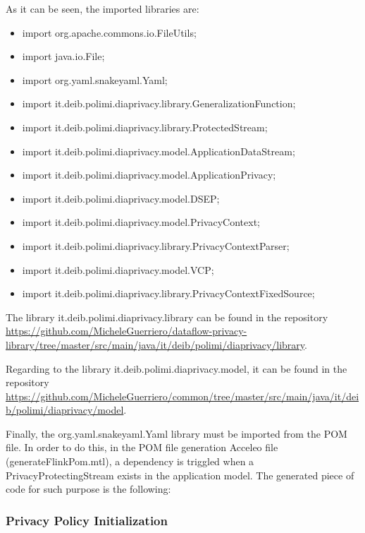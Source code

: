 

As it can be seen, the imported libraries are:

\begin{itemize}
\item import org.apache.commons.io.FileUtils;
\item import java.io.File;
\item import org.yaml.snakeyaml.Yaml;
\item import it.deib.polimi.diaprivacy.library.GeneralizationFunction;
\item import it.deib.polimi.diaprivacy.library.ProtectedStream;
\item import it.deib.polimi.diaprivacy.model.ApplicationDataStream;
\item import it.deib.polimi.diaprivacy.model.ApplicationPrivacy;
\item import it.deib.polimi.diaprivacy.model.DSEP;
\item import it.deib.polimi.diaprivacy.model.PrivacyContext;
\item import it.deib.polimi.diaprivacy.library.PrivacyContextParser;
\item import it.deib.polimi.diaprivacy.model.VCP;
\item import it.deib.polimi.diaprivacy.library.PrivacyContextFixedSource;
\end{itemize}

The library it.deib.polimi.diaprivacy.library can be found in the repository \url{https://github.com/MicheleGuerriero/dataflow-privacy-library/tree/master/src/main/java/it/deib/polimi/diaprivacy/library}.

Regarding to the library it.deib.polimi.diaprivacy.model, it can be found in the repository \url{https://github.com/MicheleGuerriero/common/tree/master/src/main/java/it/deib/polimi/diaprivacy/model}.

Finally, the org.yaml.snakeyaml.Yaml library must be imported from the POM file. In order to do this, in the POM file generation Acceleo file (generateFlinkPom.mtl), a dependency is triggled when a PrivacyProtectingStream exists in the application model. The generated piece of code for such purpose is the following:



\subsubsection{Privacy Policy Initialization}

